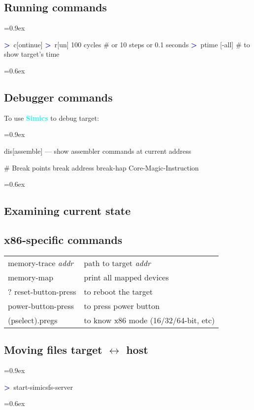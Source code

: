 \documentclass[8pt]{extarticle}
\newenvironment{code}[1][]{%
\begin{prebox}[#1]\obeylines%
\fontdimen2\font=0.9ex%
}{%
\end{prebox}%
\fontdimen2\font=0.6ex%
}
\newcommand{\ind}{\hphantom{~~~}}
\newcommand{\sprompt}{\textcolor{blue}{\textbf{>}\ }}
\newcommand{\p}[1]{\textit{\large#1}}
\newcommand{\Simics}{\textcolor{cyan}{\textbf{Simics}}}
\begin{document}
\begin{multicols*}{3}
\subsection{Running commands}
\begin{code}
\sprompt c[ontinue]
\sprompt r[un] 100 cycles \ind \# or 10 steps or 0.1 seconds
\sprompt ptime [-all] \ind \# to show target's time
\end{code}

\subsection{Debugger commands}
To use \Simics{} to debug target:
\begin{code}
dis[assemble] — show assembler commands at current address

\# Break points
break address
break-hap Core-Magic-Instruction
\end{code}

\subsection{Examining current state}

\subsection{x86-specific commands}

\begin{tabular}{ll}
    memory-trace \p{addr} & path to target \p{addr} \\
    memory-map & print all mapped devices \\
    ? reset-button-press & to reboot the target \\
    power-button-press & to press power button \\
    (pselect).pregs & to know x86 mode (16/32/64-bit, etc)
\end{tabular}

\subsection{Moving files target \texorpdfstring{$\longleftrightarrow$}{<->} host}
\begin{code}
\sprompt start-simicsfs-server
\end{code}


\end{multicols*}
\end{document}
